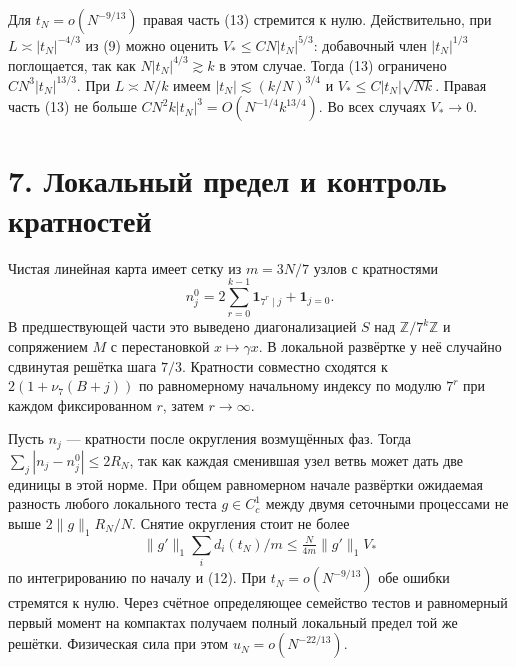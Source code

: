\documentclass[11pt,a4paper]{article}
\newcommand{\Z}{\mathbb Z}
\newcommand{\sect}[1]{\section*{\sffamily\color{ink}#1}}
\begin{document}
Для $t_N=o(N^{-9/13})$ правая часть (13) стремится к нулю. Действительно, при $L\asymp |t_N|^{-4/3}$ из (9) можно оценить $V_*\le C N |t_N|^{5/3}$: добавочный член $|t_N|^{1/3}$ поглощается, так как $N|t_N|^{4/3}\gtrsim k$ в этом случае. Тогда (13) ограничено $C N^3|t_N|^{13/3}$. При $L\asymp N/k$ имеем $|t_N|\lesssim(k/N)^{3/4}$ и $V_*\le C |t_N|\sqrt{Nk}$. Правая часть (13) не больше $C N^2k|t_N|^3=O(N^{-1/4}k^{13/4})$. Во всех случаях $V_*\to0$.
\newpage
\sect{7. Локальный предел и контроль кратностей}
Чистая линейная карта имеет сетку из $m=3N/7$ узлов с кратностями
\[
                     n_j^0=2\sum_{r=0}^{k-1}\mathbf1_{7^r\mid j}
                                      +\mathbf1_{j=0}.
\]
В предшествующей части это выведено диагонализацией $S$ над $\Z/7^k\Z$ и сопряжением $M$ с перестановкой $x\mapsto\gamma x$. В локальной развёртке у неё случайно сдвинутая решётка шага $7/3$. Кратности совместно сходятся к $2(1+\nu_7(B+j))$ по равномерному начальному индексу по модулю $7^r$ при каждом фиксированном $r$, затем $r\to\infty$.

Пусть $n_j$ --- кратности после округления возмущённых фаз. Тогда $\sum_j|n_j-n_j^0|\le2R_N$, так как каждая сменившая узел ветвь может дать две единицы в этой норме. При общем равномерном начале развёртки ожидаемая разность любого локального теста $g\in C_c^1$ между двумя сеточными процессами не выше $2\|g\|_1 R_N/N$. Снятие округления стоит не более
\[
             \|g'\|_1 \sum_i d_i(t_N)/m
                  \le \tfrac{N}{4m}\|g'\|_1 V_*
\]
по интегрированию по началу и (12). При $t_N=o(N^{-9/13})$ обе ошибки стремятся к нулю. Через счётное определяющее семейство тестов и равномерный первый момент на компактах получаем полный локальный предел той же решётки. Физическая сила при этом $u_N=o(N^{-22/13})$.
\end{document}
